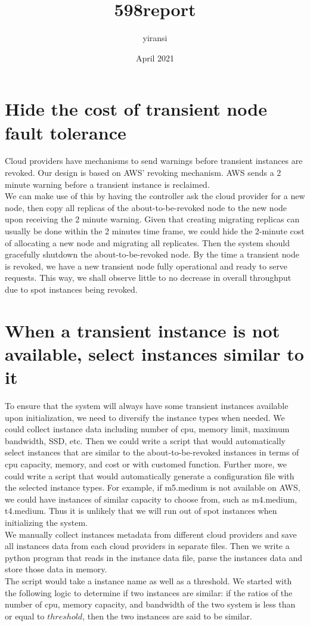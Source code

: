 \documentclass{article}
\title{598report}
\author{yiransi }
\date{April 2021}
\begin{document}
\maketitle

\section{Hide the cost of transient node fault tolerance}
Cloud providers have mechanisms to send warnings before transient instances are revoked. Our design is based on AWS' revoking mechanism. AWS sends a 2 minute warning before a transient instance is reclaimed.\\
We can make use of this by having the controller ask the cloud provider for a new node, then copy all replicas of the about-to-be-revoked node to the new node upon receiving the 2 minute warning. Given that creating migrating replicas can usually be done within the 2 minutes time frame, we could hide the 2-minute cost of allocating a new node and migrating all replicates. Then the system should gracefully shutdown the about-to-be-revoked node. By the time a transient node is revoked, we have a new transient node fully operational and ready to serve requests. This way, we shall observe little to no decrease in overall throughput due to spot instances being revoked.

\section{When a transient instance is not available, select instances similar to it}
To ensure that the system will always have some transient instances available upon initialization, we need to diversify the instance types when needed. We could collect instance data including number of cpu, memory limit, maximum bandwidth, SSD, etc. Then we could write a script that would automatically select instances that are similar to the about-to-be-revoked instances in terms of cpu capacity, memory, and cost or with customed function. Further more, we could write a script that would automatically generate a configuration file with the selected instance types. For example, if m5.medium is not available on AWS, we could have instances of similar capacity to choose from, such as m4.medium, t4.medium. Thus it is unlikely that we will run out of spot instances when initializing the system. \\
We manually collect instances metadata from different cloud providers and save all instances data from each cloud providers in separate files. Then we write a python program that reads in the instance data file, parse the instances data and store those data in memory.\\
The script would take a instance name as well as a threshold. We started with the following logic to determine if two instances are similar:  if the ratios of the number of cpu, memory capacity, and bandwidth of the two system is less than or equal to $threshold$, then the two instances are said to be similar. 
\end{document}
